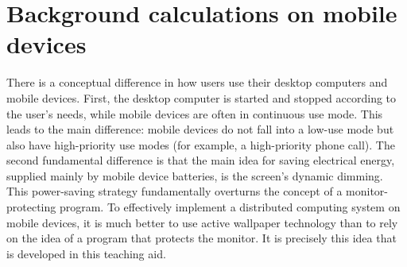 \section{Background calculations on mobile devices}

There is a conceptual difference in how users use their desktop computers and mobile devices. First, the desktop computer is started and stopped according to the user's needs, while mobile devices are often in continuous use mode. This leads to the main difference: mobile devices do not fall into a low-use mode but also have high-priority use modes (for example, a high-priority phone call). The second fundamental difference is that the main idea for saving electrical energy, supplied mainly by mobile device batteries, is the screen's dynamic dimming. This power-saving strategy fundamentally overturns the concept of a monitor-protecting program. To effectively implement a distributed computing system on mobile devices, it is much better to use active wallpaper technology than to rely on the idea of a program that protects the monitor. It is precisely this idea that is developed in this teaching aid.
